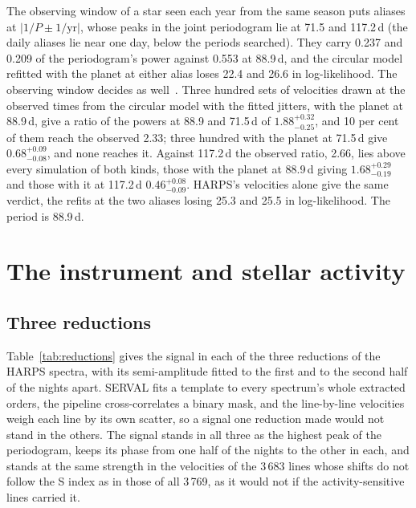 \documentclass[3p,11pt]{elsarticle}
\begin{document}
The observing window of a star seen each year from the same season puts aliases at
$|1/P \pm 1/\mathrm{yr}|$, whose peaks in the joint periodogram lie at 71.5 and 117.2\,d (the daily
aliases lie near one day, below the periods searched). They carry 0.237 and 0.209 of the periodogram's
power against 0.553 at 88.9\,d, and the circular model refitted with the planet at either alias loses
22.4 and 26.6 in log-likelihood. The observing window decides as well~\cite{Dawson2010}. Three hundred
sets of velocities drawn at the observed times from the circular model with the fitted jitters, with
the planet at 88.9\,d, give a ratio of the powers at 88.9 and 71.5\,d of $1.88^{+0.32}_{-0.25}$, and
10 per cent of them reach the observed 2.33; three hundred with the planet at 71.5\,d give
$0.68^{+0.09}_{-0.08}$, and none reaches it. Against 117.2\,d the observed ratio, 2.66, lies above
every simulation of both kinds, those with the planet at 88.9\,d giving $1.68^{+0.29}_{-0.19}$ and
those with it at 117.2\,d $0.46^{+0.08}_{-0.09}$. HARPS's velocities alone give the same verdict, the
refits at the two aliases losing 25.3 and 25.5 in log-likelihood. The period is 88.9\,d.

\section{The instrument and stellar activity}\label{sec:tests}

\subsection{Three reductions}

Table~\ref{tab:reductions} gives the signal in each of the three reductions of the HARPS spectra, with
its semi-amplitude fitted to the first and to the second half of the nights apart. SERVAL fits a
template to every spectrum's whole extracted orders, the pipeline cross-correlates a binary mask, and
the line-by-line velocities weigh each line by its own scatter, so a signal one reduction made would not
stand in the others. The signal stands in all three as the highest peak of the periodogram, keeps its
phase from one half of the nights to the other in each, and stands at the same strength in the
velocities of the 3\,683 lines whose shifts do not follow the S index as in those of all 3\,769, as it
would not if the activity-sensitive lines carried it.
\end{document}
